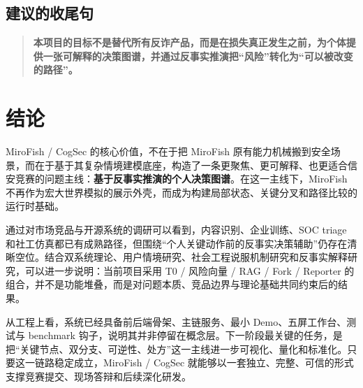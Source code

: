 \documentclass[12pt,a4paper]{ctexart}
\newcommand{\ProjectName}{MiroFish / CogSec}
\newcommand{\CorePosition}{\textbf{基于反事实推演的个人决策图谱}}
\begin{document}
\subsection{建议的收尾句}

\begin{quote}
\textbf{本项目的目标不是替代所有反诈产品，而是在损失真正发生之前，为个体提供一张可解释的决策图谱，并通过反事实推演把“风险”转化为“可以被改变的路径”。}
\end{quote}

\section{结论}

\ProjectName{} 的核心价值，不在于把 MiroFish 原有能力机械搬到安全场景，而在于基于其复杂情境建模底座，构造了一条更聚焦、更可解释、也更适合信安竞赛的问题主线：\CorePosition{}。在这一主线下，MiroFish 不再作为宏大世界模拟的展示外壳，而成为构建局部状态、关键分叉和路径比较的运行时基础。

通过对市场竞品与开源系统的调研可以看到，内容识别、企业训练、SOC triage 和社工仿真都已有成熟路径，但围绕“个人关键动作前的反事实决策辅助”仍存在清晰空位。结合双系统理论、用户情境研究、社会工程说服机制研究和反事实解释研究，可以进一步说明：当前项目采用 T0 / 风险向量 / RAG / Fork / Reporter 的组合，并不是功能堆叠，而是对问题本质、竞品边界与理论基础共同约束后的结果。

从工程上看，系统已经具备前后端骨架、主链服务、最小 Demo、五屏工作台、测试与 benchmark 钩子，说明其并非停留在概念层。下一阶段最关键的任务，是把“关键节点、双分支、可逆性、处方”这一主线进一步可视化、量化和标准化。只要这一链路稳定成立，\ProjectName{} 就能够以一套独立、完整、可信的形式支撑竞赛提交、现场答辩和后续深化研发。
\end{document}
